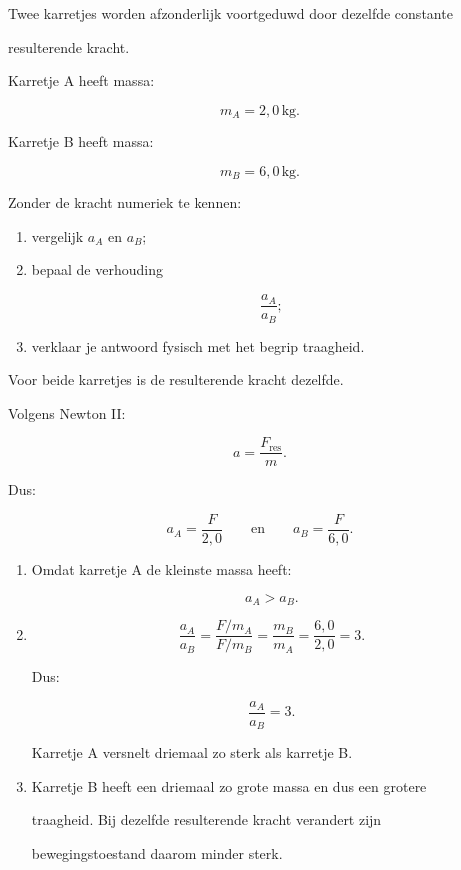 \documentclass{ximera}
\begin{document}
\begin{oefening}{\oefU\ESS}

Twee karretjes worden afzonderlijk voortgeduwd door dezelfde constante

resulterende kracht.

Karretje A heeft massa:

\[m_A=2{,}0\,\mathrm{kg}.\]

Karretje B heeft massa:

\[m_B=6{,}0\,\mathrm{kg}.\]

Zonder de kracht numeriek te kennen:

\begin{enumerate}

 \item vergelijk $a_A$ en $a_B$;

 \item bepaal de verhouding

 \[\frac{a_A}{a_B};\]

 \item verklaar je antwoord fysisch met het begrip traagheid.

\end{enumerate}


\begin{oplossing}

Voor beide karretjes is de resulterende kracht dezelfde.

Volgens Newton II:

\[a=\frac{F_{\mathrm{res}}}{m}.\]

Dus:

\[a_A=\frac{F}{2{,}0} \qquad\text{en}\qquad a_B=\frac{F}{6{,}0}.\]

\begin{enumerate}

  \item Omdat karretje A de kleinste massa heeft:

  \[\boxed{a_A>a_B}.\]

  \item

  \[\frac{a_A}{a_B} = \frac{F/m_A}{F/m_B} = \frac{m_B}{m_A} = \frac{6{,}0}{2{,}0} =3.\]

  Dus:

  \[\boxed{\frac{a_A}{a_B}=3}.\]

  Karretje A versnelt driemaal zo sterk als karretje B.

  \item Karretje B heeft een driemaal zo grote massa en dus een grotere

  traagheid. Bij dezelfde resulterende kracht verandert zijn

  bewegingstoestand daarom minder sterk.

\end{enumerate}

\end{oplossing}

\end{oefening}
\end{document}

